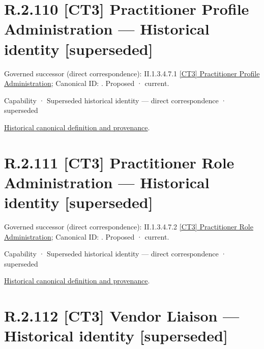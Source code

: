 \section*{R.2.110 [CT3] Practitioner Profile Administration — Historical identity [superseded]}
\label{navigation:R.2.110}

{\small Governed successor (direct correspondence): II.1.3.4.7.1 \hyperref[element:40759a835f7b456e9257c38b67b0a380]{[CT3] Practitioner Profile Administration}; Canonical ID: \texttt{}. Proposed · current.}\par
\label{element:2415ddcbc73c47e1a63be310bd4342ee}
{\small Capability · Superseded historical identity — direct correspondence · superseded}\par
\href{../../../../continuum/strategy/capability/2415ddcbc73c47e1a63be310bd4342ee.md}{Historical canonical definition and provenance}.\par
\section*{R.2.111 [CT3] Practitioner Role Administration — Historical identity [superseded]}
\label{navigation:R.2.111}

{\small Governed successor (direct correspondence): II.1.3.4.7.2 \hyperref[element:6651471e67ae46fb8d1c1241c8590be9]{[CT3] Practitioner Role Administration}; Canonical ID: \texttt{}. Proposed · current.}\par
\label{element:6b777f1201db474eb22dd89f2b1f68c6}
{\small Capability · Superseded historical identity — direct correspondence · superseded}\par
\href{../../../../continuum/strategy/capability/6b777f1201db474eb22dd89f2b1f68c6.md}{Historical canonical definition and provenance}.\par
\section*{R.2.112 [CT3] Vendor Liaison — Historical identity [superseded]}
\label{navigation:R.2.112}

